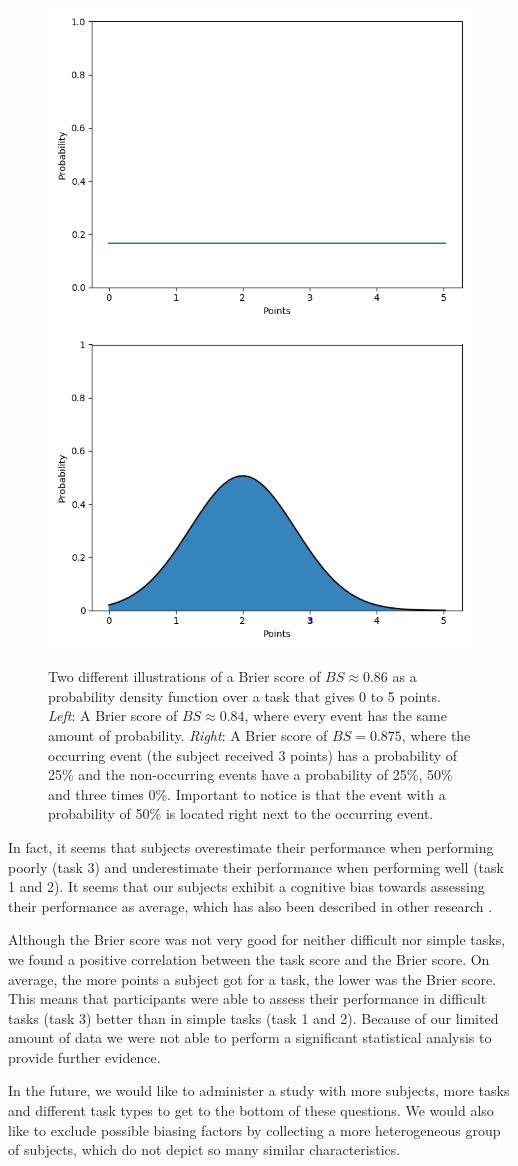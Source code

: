 \documentclass[../main/main.tex]{subfiles}
\begin{document}
	\begin{figure}[H]
		\centering
		\includegraphics[width=.49\textwidth]{../assets/brier_plot.png}
		\includegraphics[width=.49\textwidth]{../assets/brier_plot2.png}
		\caption{Two different illustrations of a Brier score of $BS \approx 0.86$ as a probability density function over a task that gives 0 to 5 points. \textit{Left}: A Brier score of $BS \approx 0.84$, where every event has the same amount of probability. \textit{Right}: A Brier score of $BS = 0.875$, where the occurring event (the subject received 3 points) has a probability of 25\% and the non-occurring events have a probability of 25\%, 50\% and three times 0\%. Important to notice is that the event with a probability of 50\% is located right next to the occurring event.}
		\label{fig:briers}
	\end{figure}
	\newpage
	\noindent In fact, it seems that subjects overestimate their performance when performing poorly (task 3) and underestimate their performance when performing well (task 1 and 2). It seems that our subjects exhibit a cognitive bias towards assessing their performance as average, which has also been described in other research \citep{kruger1999unskilled}.

	Although the Brier score was not very good for neither difficult nor simple tasks, we found a positive correlation between the task score and the Brier score. On average, the more points a subject got for a task, the lower was the Brier score. This means that participants were able to assess their performance in difficult tasks (task 3) better than in simple tasks (task 1 and 2). Because of our limited amount of data we were not able to perform a significant statistical analysis to provide further evidence.
	
	In the future, we would like to administer a study with more subjects, more tasks and different task types to get to the bottom of these questions. We would also like to exclude possible biasing factors by collecting a more heterogeneous group of subjects, which do not depict so many similar characteristics.
	
	
	
	
\end{document}
